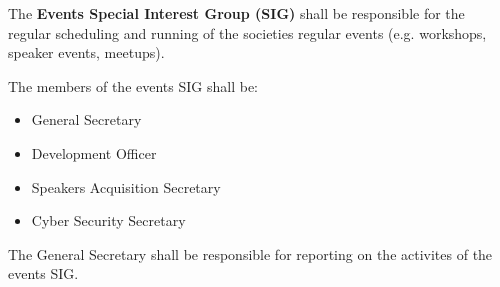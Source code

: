 \begin{clause}
    The \textbf{Events Special Interest Group (SIG)} shall be responsible for the regular scheduling and running of the societies regular events (e.g. workshops, speaker events, meetups).
\end{clause}

\begin{subclause}
    The members of the events SIG shall be:
    \begin{itemize}[label=--,topsep=0em,itemsep=0em]
        \item General Secretary
        \item Development Officer
        \item Speakers Acquisition Secretary
        \item Cyber Security Secretary
    \end{itemize}
\end{subclause}

\begin{subclause}
    The General Secretary shall be responsible for reporting on the activites of the events SIG.
\end{subclause}